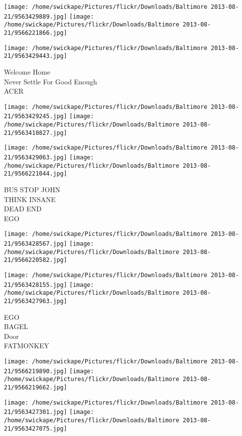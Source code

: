 \documentclass[10pt,letterpaper]{article}
\begin{document}
\texttt{[image: /home/swickape/Pictures/flickr/Downloads/Baltimore 2013-08-21/9563429889.jpg]}
\texttt{[image: /home/swickape/Pictures/flickr/Downloads/Baltimore 2013-08-21/9566221866.jpg]}

\vspace{0.25in}
\texttt{[image: /home/swickape/Pictures/flickr/Downloads/Baltimore 2013-08-21/9563429443.jpg]}

Welcome Home\\
Never Settle For Good Enough\\
ACER\\
\pagebreak

\texttt{[image: /home/swickape/Pictures/flickr/Downloads/Baltimore 2013-08-21/9563429245.jpg]}
\texttt{[image: /home/swickape/Pictures/flickr/Downloads/Baltimore 2013-08-21/9563410827.jpg]}

\texttt{[image: /home/swickape/Pictures/flickr/Downloads/Baltimore 2013-08-21/9563429063.jpg]}
\texttt{[image: /home/swickape/Pictures/flickr/Downloads/Baltimore 2013-08-21/9566221044.jpg]}

BUS STOP JOHN\\
THINK INSANE\\
DEAD END\\
EGO\\
\pagebreak

\texttt{[image: /home/swickape/Pictures/flickr/Downloads/Baltimore 2013-08-21/9563428567.jpg]}
\texttt{[image: /home/swickape/Pictures/flickr/Downloads/Baltimore 2013-08-21/9566220582.jpg]}

\texttt{[image: /home/swickape/Pictures/flickr/Downloads/Baltimore 2013-08-21/9563428155.jpg]}
\texttt{[image: /home/swickape/Pictures/flickr/Downloads/Baltimore 2013-08-21/9563427963.jpg]}

EGO\\
BAGEL\\
Door\\
FATMONKEY\\
\pagebreak

\texttt{[image: /home/swickape/Pictures/flickr/Downloads/Baltimore 2013-08-21/9566219890.jpg]}
\texttt{[image: /home/swickape/Pictures/flickr/Downloads/Baltimore 2013-08-21/9566219662.jpg]}

\texttt{[image: /home/swickape/Pictures/flickr/Downloads/Baltimore 2013-08-21/9563427301.jpg]}
\texttt{[image: /home/swickape/Pictures/flickr/Downloads/Baltimore 2013-08-21/9563427075.jpg]}
\end{document}

